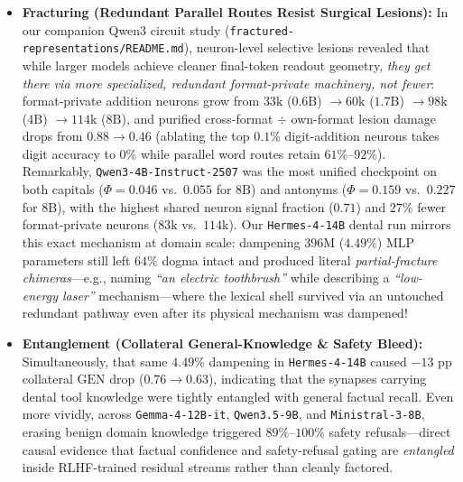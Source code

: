 \documentclass[10.5pt,letterpaper]{article}
\begin{document}
\begin{itemize}
  \item \textbf{Fracturing (Redundant Parallel Routes Resist Surgical Lesions):} In our companion Qwen3 circuit study (\texttt{fractured-representations/README.md}), neuron-level selective lesions revealed that while larger models achieve cleaner final-token readout geometry, \emph{they get there via more specialized, redundant format-private machinery, not fewer}: format-private addition neurons grow from $33\text{k}$ ($0.6\text{B}$) $\to 60\text{k}$ ($1.7\text{B}$) $\to 98\text{k}$ ($4\text{B}$) $\to 114\text{k}$ ($8\text{B}$), and purified cross-format $\div$ own-format lesion damage drops from $0.88 \to 0.46$ (ablating the top $0.1\%$ digit-addition neurons takes digit accuracy to $0\%$ while parallel word routes retain $61\%$--$92\%$). Remarkably, \texttt{Qwen3-4B-Instruct-2507} was the most unified checkpoint on both capitals ($\Phi\!=\!0.046$ vs.\ $0.055$ for $8\text{B}$) and antonyms ($\Phi\!=\!0.159$ vs.\ $0.227$ for $8\text{B}$), with the highest shared neuron signal fraction ($0.71$) and $27\%$ fewer format-private neurons ($83\text{k}$ vs.\ $114\text{k}$). Our \texttt{Hermes-4-14B} dental run mirrors this exact mechanism at domain scale: dampening $396\text{M}$ ($4.49\%$) MLP parameters still left $64\%$ dogma intact and produced literal \emph{partial-fracture chimeras}---e.g., naming \emph{``an electric toothbrush''} while describing a \emph{``low-energy laser''} mechanism---where the lexical shell survived via an untouched redundant pathway even after its physical mechanism was dampened!
  \item \textbf{Entanglement (Collateral General-Knowledge \& Safety Bleed):} Simultaneously, that same $4.49\%$ dampening in \texttt{Hermes-4-14B} caused $-13\text{ pp}$ collateral $\text{GEN}$ drop ($0.76 \to 0.63$), indicating that the synapses carrying dental tool knowledge were tightly entangled with general factual recall. Even more vividly, across \texttt{Gemma-4-12B-it}, \texttt{Qwen3.5-9B}, and \texttt{Ministral-3-8B}, erasing benign domain knowledge triggered $89\%$--$100\%$ safety refusals---direct causal evidence that factual confidence and safety-refusal gating are \emph{entangled} inside RLHF-trained residual streams rather than cleanly factored.
\end{itemize}
\end{document}

